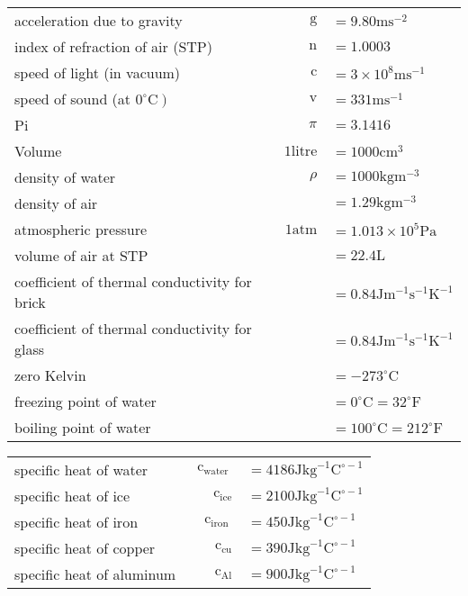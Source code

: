 \documentclass{extarticle}
\begin{document}
\begin{tabularx}{\textwidth}{Xr@{}l}

acceleration due to gravity & $\mathrm{g}$ & $=9.80 \mathrm{m} \mathrm{s}^{-2}$ \\
index of refraction of air (STP) & $\mathrm{n}$ & $=1.0003$ \\
speed of light (in vacuum) & $\mathrm{c}$ & $=3 \times 10^{8} \mathrm{ms}^{-1}$ \\
speed of sound (at $\left.0^{\circ} \mathrm{C}\right)$ & $\mathrm{v}$ & $=331 \mathrm{ms}^{-1}$ \\
Pi & $\pi$ & $=3.1416$ \\
Volume & $1 \text {litre}$ & $=1000 \mathrm{cm}^{3}$ \\
density of water & $\rho$ & $=1000 \mathrm{kg} \mathrm{m}^{-3}$ \\
density of air & & $=1.29 \mathrm{kg} \mathrm{m}^{-3}$ \\
atmospheric pressure & $1 \mathrm{atm}$ & $=1.013 \times 10^{5} \mathrm{Pa}$ \\
volume of air at STP & & $=22.4 \mathrm{L}$ \\
coefficient of thermal conductivity for brick & & $=0.84 \mathrm{J} \mathrm{m}^{-1} \mathrm{s}^{-1} \mathrm{K}^{-1}$ \\
coefficient of thermal conductivity for glass & & $=0.84 \mathrm{J} \mathrm{m}^{-1} \mathrm{s}^{-1} \mathrm{K}^{-1}$ \\
zero Kelvin & & $=-273^{\circ} \mathrm{C}$ \\
freezing point of water & & $=0^{\circ} \mathrm{C}=32^{\circ} \mathrm{F}$ \\
boiling point of water & & $=100^{\circ} \mathrm{C}=212^{\circ} \mathrm{F}$ \\

\end{tabularx}

\begin{tabularx}{\textwidth}{Xr@{}l}

specific heat of water & $\mathrm{c}_{\text {water }}$ & $=4186 \mathrm{J} \mathrm{kg}^{-1} \mathrm{C}^{\circ-1}$ \\
specific heat of ice & $\quad \mathrm{c}_{\mathrm{ice}}$ & $=2100 \mathrm{J} \mathrm{kg}^{-1} \mathrm{C}^{\circ-1}$ \\
specific heat of iron & $\quad \mathrm{c}_{\text {iron }}$ & $=450 \mathrm{J} \mathrm{kg}^{-1} \mathrm{C}^{\circ-1}$ \\
specific heat of copper & $\mathrm{c}_{\mathrm{cu}}$ & $=390 \mathrm{J} \mathrm{kg}^{-1} \mathrm{C}^{\circ-1}$ \\
specific heat of aluminum & $\mathrm{c}_{\mathrm{Al}}$ & $=900 \mathrm{J} \mathrm{kg}^{-1} \mathrm{C}^{\circ-1}$ \\

\end{tabularx}
\end{document}
